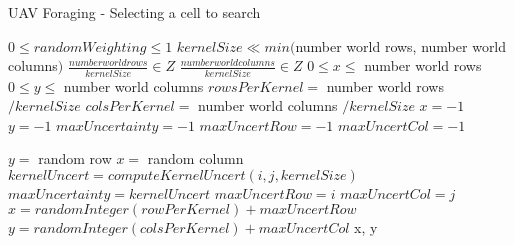 \begin{algorithm}
	\caption{UAV Foraging - Selecting a cell to search}
	\label{alg:forage}
	\begin{algorithmic}[1]
		\REQUIRE $ 0\le randomWeighting \le 1$
		\REQUIRE $ kernelSize \ll min($number world rows, number world columns$)$
		\REQUIRE $ \frac{number world rows}{kernelSize} \in Z$
		\REQUIRE $ \frac{number world columns}{kernelSize} \in Z$
		\ENSURE $ 0 \le x \le $ number world rows
		\ENSURE $ 0 \le y \le $ number world columns
		\STATE $rowsPerKernel = $ number world rows $ / kernelSize$
		\STATE $colsPerKernel = $ number world columns $ / kernelSize$		
		\STATE $x = -1$
		\STATE $y = -1$
		\STATE $maxUncertainty = -1$
		\STATE $maxUncertRow = -1$
		\STATE $maxUncertCol = -1$
		
		
		\STATE $ y = $ random row
		\STATE $ x = $ random column
		\ELSE
		\STATE $kernelUncert = computeKernelUncert(i,j, kernelSize)$
		\STATE $maxUncertainty = kernelUncert$
		\STATE $maxUncertRow = i$
		\STATE $maxUncertCol = j$	
		\ENDIF
		\ENDFOR
		\ENDFOR
		\STATE $x = randomInteger(rowPerKernel) + maxUncertRow$			
		\STATE $y = randomInteger(colsPerKernel) + maxUncertCol$
		\ENDIF
		\RETURN x, y
	\end{algorithmic}
\end{algorithm}